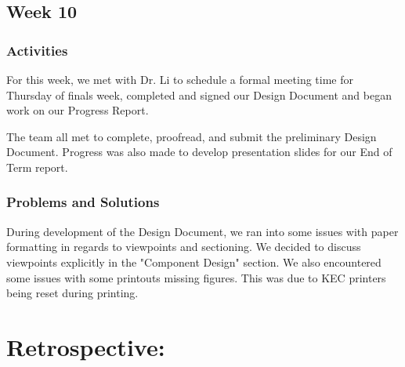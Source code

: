 \documentclass[journal,10pt,onecolumn,compsoc]{IEEEtran} \usepackage[margin=1.0in]{geometry} \usepackage{pdfpages}
\begin{document}
\subsection{Week 10}
\subsubsection{Activities}
For this week, we met with Dr. Li to schedule a formal meeting time for Thursday of finals week, completed and signed our Design Document and began work on our Progress Report.

\noindent The team all met to complete, proofread, and submit the preliminary Design Document. 
Progress was also made to develop presentation slides for our End of Term report.

\subsubsection{Problems and Solutions}
During development of the Design Document, we ran into some issues with paper formatting in regards to viewpoints and sectioning.
We decided to discuss viewpoints explicitly in the "Component Design" section.
We also encountered some issues with some printouts missing figures.
This was due to KEC printers being reset during printing.

\section{Retrospective:}
\end{document}
